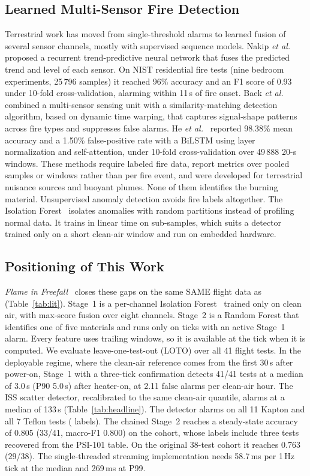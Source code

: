 \subsection{Learned Multi-Sensor Fire Detection}
Terrestrial work has moved from single-threshold alarms to learned fusion of several sensor channels, mostly with supervised sequence models. Nakip \emph{et al.}~\cite{nakip2021rtpnn} proposed a recurrent trend-predictive neural network that fuses the predicted trend and level of each sensor. On NIST residential fire tests (nine bedroom experiments, 25\,796 samples) it reached 96\% accuracy and an F1 score of 0.93 under 10-fold cross-validation, alarming within 11\,s of fire onset. Baek \emph{et al.}~\cite{baek2021intelligent} combined a multi-sensor sensing unit with a similarity-matching detection algorithm, based on dynamic time warping, that captures signal-shape patterns across fire types and suppresses false alarms. He \emph{et al.}~\cite{he2025bilstm} reported 98.38\% mean accuracy and a 1.50\% false-positive rate with a BiLSTM using layer normalization and self-attention, under 10-fold cross-validation over 49\,888 20-s windows. These methods require labeled fire data, report metrics over pooled samples or windows rather than per fire event, and were developed for terrestrial nuisance sources and buoyant plumes. None of them identifies the burning material. Unsupervised anomaly detection avoids fire labels altogether. The Isolation Forest~\cite{liu2008isolation} isolates anomalies with random partitions instead of profiling normal data. It trains in linear time on sub-samples, which suits a detector trained only on a short clean-air window and run on embedded hardware.

\subsection{Positioning of This Work}
\emph{Flame in Freefall}~\cite{blueprint67repo} closes these gaps on the same SAME flight data as~\cite{meyer2018evaluation} (Table~\ref{tab:lit}). Stage~1 is a per-channel Isolation Forest~\cite{liu2008isolation} trained only on clean air, with max-score fusion over eight channels. Stage~2 is a Random Forest that identifies one of five materials and runs only on ticks with an active Stage~1 alarm. Every feature uses trailing windows, so it is available at the tick when it is computed. We evaluate leave-one-test-out (LOTO) over all 41 flight tests. In the deployable \arming{} regime, where the clean-air reference comes from the first 30\,s after power-on, Stage~1 with a three-tick confirmation detects 41/41 tests at a median of 3.0\,s (P90 5.0\,s) after heater-on, at 2.11 false alarms per clean-air hour. The ISS scatter detector, recalibrated to the same clean-air quantile, alarms at a median of 133\,s (Table~\ref{tab:headline}). The detector alarms on all 11 Kapton and all 7 Teflon tests (\psiset{} labels). The chained Stage~2 reaches a steady-state accuracy of 0.805 (33/41, macro-F1 0.800) on the \psiset{} cohort, whose labels include three tests recovered from the PSI-101 table. On the original 38-test \reposet{} cohort it reaches 0.763 (29/38). The single-threaded streaming implementation needs 58.7\,ms per 1\,Hz tick at the median and 269\,ms at P99.

